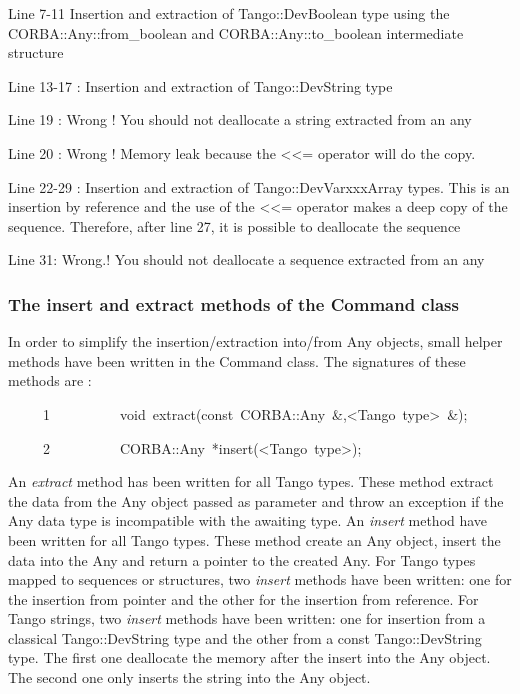 Line 7-11 Insertion and extraction of Tango::DevBoolean type using
the CORBA::Any::from\_boolean and CORBA::Any::to\_boolean intermediate
structure

Line 13-17 : Insertion and extraction of Tango::DevString type

Line 19 : Wrong ! You should not deallocate a string extracted from
an any

Line 20 : Wrong ! Memory leak because the <\textcompwordmark{}<= operator
will do the copy. 

Line 22-29 : Insertion and extraction of Tango::DevVarxxxArray types.
This is an insertion by reference and the use of the <\textcompwordmark{}<=
operator makes a deep copy of the sequence. Therefore, after line
27, it is possible to deallocate the sequence

Line 31: Wrong.! You should not deallocate a sequence extracted from
an any


\subsubsection{The insert and extract methods of the Command class}

In order to simplify the insertion/extraction into/from Any
objects, small helper methods have been written in the Command
class. The signatures of these methods are :


\begin{lyxcode}
~~~~~1~~~~~~~~~~void~extract(const~CORBA::Any~\&,<Tango~type>~\&);

~~~~~2~~~~~~~~~~CORBA::Any~{*}insert(<Tango~type>);
\end{lyxcode}


An \emph{extract} method has been written for all Tango types. These
method extract the data from the Any object passed as parameter and
throw an exception if the Any data type is incompatible with the awaiting
type. An \emph{insert} method have been written for all Tango types.
These method create an Any object, insert the data into the Any and
return a pointer to the created Any. For Tango types mapped to sequences
or structures, two \emph{insert} methods have been written: one for
the insertion from pointer and the other for the insertion from reference.
For Tango strings, two \emph{insert} methods have been written: one
for insertion from a classical Tango::DevString type and the other
from a const Tango::DevString type. The first one deallocate the memory
after the insert into the Any object. The second one only inserts
the string into the Any object. 

